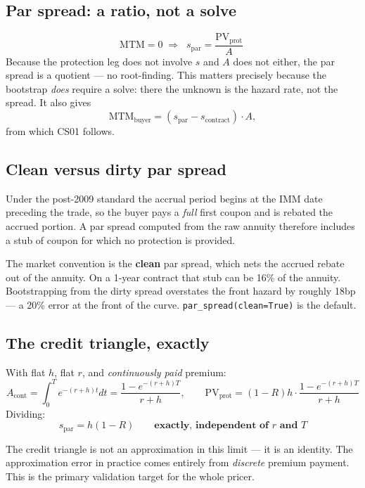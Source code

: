\documentclass[11pt,a4paper]{article}
\newcommand{\keypoint}[1]{%
  \par\vspace{0.4em}\noindent
  \colorbox{codebg}{\parbox{\dimexpr\linewidth-2\fboxsep}{\small #1}}%
  \par\vspace{0.5em}}
\begin{document}
\subsection{Par spread: a ratio, not a solve}
\begin{equation}
\text{MTM}=0 \;\Longrightarrow\;
\boxed{\;s_{\text{par}} = \frac{\text{PV}_{\text{prot}}}{A}\;}
\end{equation}
Because the protection leg does not involve $s$ and $A$ does not either, the par spread is a
quotient --- no root-finding. This matters precisely because the bootstrap \emph{does} require
a solve: there the unknown is the hazard rate, not the spread. It also gives
\[
\text{MTM}_{\text{buyer}} = (s_{\text{par}} - s_{\text{contract}})\cdot A ,
\]
from which CS01 follows.

\subsection{Clean versus dirty par spread}

Under the post-2009 standard the accrual period begins at the IMM date preceding the trade,
so the buyer pays a \emph{full} first coupon and is rebated the accrued portion. A par spread
computed from the raw annuity therefore includes a stub of coupon for which no protection is
provided.

\keypoint{The market convention is the \textbf{clean} par spread, which nets the accrued
rebate out of the annuity. On a 1-year contract that stub can be 16\% of the annuity.
Bootstrapping from the dirty spread overstates the front hazard by roughly 18bp --- a 20\%
error at the front of the curve. \texttt{par\_spread(clean=True)} is the default.}

\subsection{The credit triangle, exactly}

With flat $h$, flat $r$, and \emph{continuously paid} premium:
\[
A_{\text{cont}} = \int_0^T e^{-(r+h)t}dt = \frac{1-e^{-(r+h)T}}{r+h},
\qquad
\text{PV}_{\text{prot}} = (1-R)h\cdot\frac{1-e^{-(r+h)T}}{r+h}
\]
Dividing:
\begin{equation}
s_{\text{par}} = h(1-R) \qquad \textbf{exactly, independent of } r \textbf{ and } T
\end{equation}

\keypoint{The credit triangle is not an approximation in this limit --- it is an identity. The
approximation error in practice comes entirely from \emph{discrete} premium payment. This is
the primary validation target for the whole pricer.}
\end{document}
